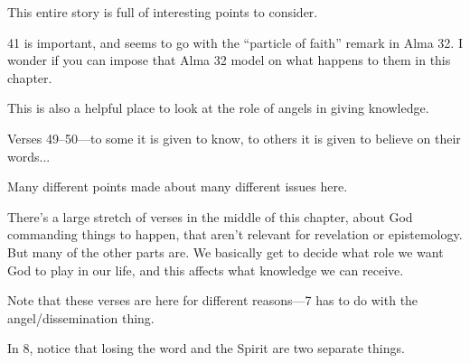 \begin{compactdesc}
\begin{compactitem}
					\item This entire story is full of interesting points to consider.
					\item 41 is important, and seems to go with the ``particle of faith'' remark in Alma 32. I wonder if you can impose that Alma 32 model on what happens to them in this chapter.
					\item This is also a helpful place to look at the role of angels in giving knowledge.
					\item Verses 49--50---to some it is given to know, to others it is given to believe on their words...
				\end{compactitem}
			\item[{\hyperref[HELAMAN-6-34]{Helaman 6:34--36}}]
			\item[{\hyperref[HELAMAN-7-23]{Helaman 7:23--24}}]
			\item[{\hyperref[HELAMAN-7-29]{Helaman 7:23--29}}]
			\item[{\hyperref[HELAMAN-8-14]{Helaman 8:14--25}}] \phantom{.}
				\begin{compactitem}
					\item Many different points made about many different issues here.
				\end{compactitem}
			\item[{\hyperref[HELAMAN-9-1]{Helaman 9:1--5}}]
			\item[{\hyperref[HELAMAN-11-23]{Helaman 11:23}}]
			\item[{\hyperref[HELAMAN-12]{Helaman 12}}] \phantom{.}
				\begin{compactitem}
					\item There's a large stretch of verses in the middle of this chapter, about God commanding things to happen, that aren't relevant for revelation or epistemology. But many of the other parts are. We basically get to decide what role we want God to play in our life, and this affects what knowledge we can receive.
				\end{compactitem}
			\item[{\hyperref[HELAMAN-13-3]{Helaman 13:3--5}}] 
			\item[{\hyperref[HELAMAN-13-7]{Helaman 13:7--8}}] \phantom{.}
				\begin{compactitem}
					\item Note that these verses are here for different reasons---7 has to do with the angel/dissemination thing.
					\item In 8, notice that losing the word and the Spirit are two separate things.

\end{compactitem}
\end{compactdesc}
